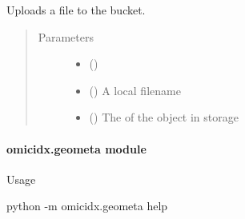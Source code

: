 \documentclass[letterpaper,10pt,english]{sphinxmanual}
\begin{document}
\begin{fulllineitems}
\label{\detokenize{omicidx.gcs_utils:omicidx.gcs_utils.upload_blob_to_gcs}}
Uploads a file to the bucket.
\begin{quote}\begin{description}
\item[{Parameters}] \leavevmode\begin{itemize}
\item {} 
 () \textendash{} 

\item {} 
 () \textendash{} A local filename

\item {} 
 () \textendash{} The  of the object in storage

\end{itemize}

\end{description}\end{quote}

\end{fulllineitems}



\paragraph{omicidx.geometa module}
\label{\detokenize{omicidx.geometa:module-omicidx.geometa}}\label{\detokenize{omicidx.geometa:omicidx-geometa-module}}\label{\detokenize{omicidx.geometa::doc}}
Usage

python -m omicidx.geometa \textendash{}help
\end{document}
